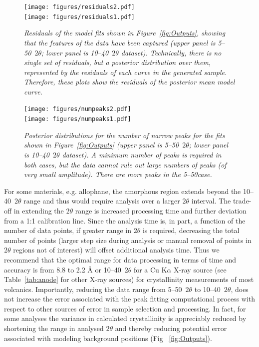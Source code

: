 \documentclass[review]{elsarticle}
\newcommand{\changed}{\color{blue}}
\begin{document}
\begin{figure}[!ht]
  \begin{minipage}{\textwidth}
    \centering
    \texttt{[image: figures/residuals2.pdf]} \\
    \texttt{[image: figures/residuals1.pdf]}
  \end{minipage}
\caption{\it \changed Residuals of the model fits shown in Figure~\ref{fig:Outputs}, showing that the features of the data have been captured (upper panel is 5--50\degree~$2\theta$; lower panel is 10--40\degree~$2\theta$ dataset). Technically, there is no single set of
residuals, but a posterior distribution over them, represented by
the residuals of each curve in the generated sample. Therefore, these
plots show the residuals of the posterior mean model curve.\label{fig:residuals_etc}}
\end{figure}

\begin{figure}[!ht]
  \begin{minipage}{\textwidth}
    \centering
    \texttt{[image: figures/numpeaks2.pdf]} \\
    \texttt{[image: figures/numpeaks1.pdf]}
  \end{minipage}
\caption{\it \changed Posterior distributions for the number of narrow peaks for the fits shown in Figure~\ref{fig:Outputs} (upper panel is 5--50\degree~$2\theta$; lower panel is 10--40\degree~$2\theta$ dataset). A minimum number of peaks is required in both cases, but the data cannot rule out large numbers of peaks (of very small amplitude). There are more peaks in the
5--50\degree case.\label{fig:num_peaks}}
\end{figure}

{\changed For some materials, e.g. allophane, the amorphous region extends beyond the 10--40\degree~$2\theta$ range and thus would require analysis over a larger $2\theta$ interval. 
The trade-off in extending the $2\theta$ range is increased processing time and further deviation from a 1:1 calibration line. Since the analysis time is, in part, a function of the number of data points, if greater range in $2\theta$ is required, decreasing the total number of points (larger step size during analysis or manual removal of points in $2\theta$ regions not of interest) will offset additional analysis time. Thus we recommend that the optimal range for data processing in terms of time and accuracy is from 8.8 to 2.2 {\AA} or 10--40\degree~$2\theta$ for a Cu K{$\alpha$} X-ray source (see Table~\ref{tab:anode} for other X-ray sources) for crystallinity measurements of most volcanics. Importantly, reducing the data range from 5--50\degree~$2\theta$ to 10--40\degree~$2\theta$, does not increase the error associated with the peak fitting computational process with respect to other sources of error in sample selection and processing. In fact, for some analyses the variance in calculated crystallinity is appreciably reduced by shortening the range in analysed $2\theta$ and thereby reducing potential error associated with modeling background positions (Fig ~\ref{fig:Outputs}).}
\end{document}
